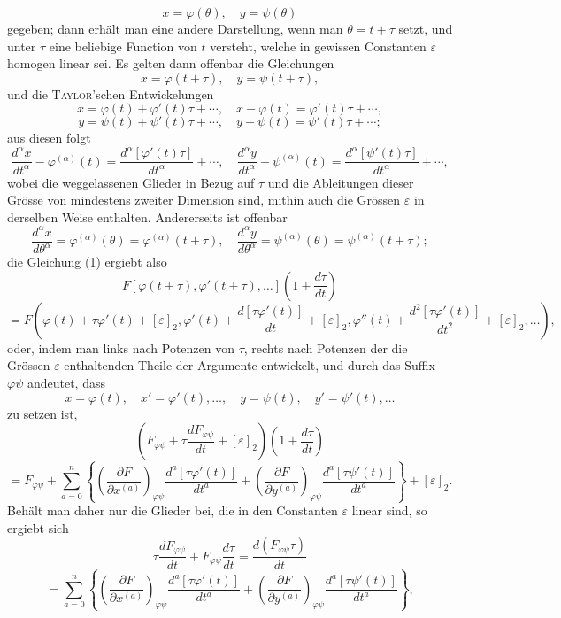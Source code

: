\documentclass[11pt,a4paper,leqno]{article}
\begin{document}
\begin{equation}\tag{2}
x=\varphi(\theta),\quad y=\psi(\theta)
\end{equation}
gegeben; dann erhält man eine andere Darstellung, wenn man $\theta=t+\tau$ setzt, und unter $\tau$ eine beliebige Function von $t$ versteht, welche in gewissen Constanten $\varepsilon$ homogen linear sei. Es gelten dann offenbar die Gleichungen
\[
x=\varphi(t+\tau),\quad y=\psi(t+\tau),
\]
und die \textsc{Taylor}'schen Entwickelungen
\[
x=\varphi(t)+\varphi'(t)\tau+\cdots,
\quad x-\varphi(t)=\varphi'(t)\tau+\cdots,
\]
\[
y=\psi(t)+\psi'(t)\tau+\cdots,
\quad y-\psi(t)=\psi'(t)\tau+\cdots;
\]
aus diesen folgt
\[
\frac{d^\alpha x}{dt^\alpha}-\varphi^{(\alpha)}(t)
=\frac{d^\alpha[\varphi'(t)\tau]}{dt^\alpha}+\cdots,
\quad
\frac{d^\alpha y}{dt^\alpha}-\psi^{(\alpha)}(t)
=\frac{d^\alpha[\psi'(t)\tau]}{dt^\alpha}+\cdots,
\]
wobei die weggelassenen Glieder in Bezug auf $\tau$ und die Ableitungen dieser Grösse von mindestens zweiter Dimension sind,
mithin auch die Grössen $\varepsilon$ in derselben Weise enthalten. Andererseits ist offenbar
\[
\frac{d^\alpha x}{d\theta^\alpha}=\varphi^{(\alpha)}(\theta)=\varphi^{(\alpha)}(t+\tau),
\quad
\frac{d^\alpha y}{d\theta^\alpha}=\psi^{(\alpha)}(\theta)=\psi^{(\alpha)}(t+\tau);
\]
die Gleichung (1) ergiebt also
\[
F[\varphi(t+\tau),\varphi'(t+\tau),\ldots]\left(1+\frac{d\tau}{dt}\right)
\]
\[
=F\left(\varphi(t)+\tau\varphi'(t)+[\varepsilon]_2,
\varphi'(t)+\frac{d[\tau\varphi'(t)]}{dt}+[\varepsilon]_2,
\varphi''(t)+\frac{d^2[\tau\varphi'(t)]}{dt^2}+[\varepsilon]_2,\ldots\right),
\]
oder, indem man links nach Potenzen von $\tau$, rechts nach Potenzen der die Grössen $\varepsilon$ enthaltenden Theile der Argumente entwickelt, und durch das Suffix $\varphi\psi$ andeutet, dass
\[
x=\varphi(t),\quad x'=\varphi'(t),\ldots,
\quad y=\psi(t),\quad y'=\psi'(t),\ldots
\]
zu setzen ist,
\[
\left(F_{\varphi\psi}+\tau\frac{dF_{\varphi\psi}}{dt}+[\varepsilon]_2\right)\left(1+\frac{d\tau}{dt}\right)
\]
\[
=F_{\varphi\psi}+\sum_{a=0}^n\left\{\left(\frac{\partial F}{\partial x^{(a)}}\right)_{\varphi\psi}\frac{d^a[\tau\varphi'(t)]}{dt^a}
+\left(\frac{\partial F}{\partial y^{(a)}}\right)_{\varphi\psi}\frac{d^a[\tau\psi'(t)]}{dt^a}\right\}+[\varepsilon]_2.
\]
Behält man daher nur die Glieder bei, die in den Constanten $\varepsilon$ linear sind, so ergiebt sich
\[
\tau\frac{dF_{\varphi\psi}}{dt}+F_{\varphi\psi}\frac{d\tau}{dt}
=\frac{d(F_{\varphi\psi}\tau)}{dt}
\]
\[
=\sum_{a=0}^n\left\{\left(\frac{\partial F}{\partial x^{(a)}}\right)_{\varphi\psi}\frac{d^a[\tau\varphi'(t)]}{dt^a}
+\left(\frac{\partial F}{\partial y^{(a)}}\right)_{\varphi\psi}\frac{d^a[\tau\psi'(t)]}{dt^a}\right\},
\]
\end{document}
